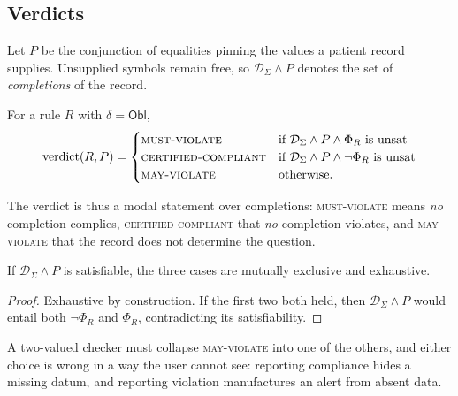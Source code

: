 \subsection{Verdicts}
\label{sec:verdict}

Let $P$ be the conjunction of equalities pinning the values a patient record
supplies. Unsupplied symbols remain free, so $\mathcal{D}_\Sigma \wedge P$
denotes the set of \emph{completions} of the record.

\begin{definition}[Verdict]
For a rule $R$ with $\delta = \mathsf{Obl}$,
\[
\mathrm{verdict}(R,P) =
\begin{cases}
  \textsc{must-violate}
    & \text{if } \mathcal{D}_\Sigma \wedge P \wedge \Phi_R \text{ is unsat} \\
  \textsc{certified-compliant}
    & \text{if } \mathcal{D}_\Sigma \wedge P \wedge \neg\Phi_R \text{ is unsat} \\
  \textsc{may-violate} & \text{otherwise.}
\end{cases}
\]
\end{definition}

The verdict is thus a modal statement over completions: \textsc{must-violate}
means \emph{no} completion complies, \textsc{certified-compliant} that
\emph{no} completion violates, and \textsc{may-violate} that the record does
not determine the question.

\begin{proposition}
If $\mathcal{D}_\Sigma \wedge P$ is satisfiable, the three cases are mutually
exclusive and exhaustive.
\end{proposition}
\begin{proof}
Exhaustive by construction. If the first two both held, then
$\mathcal{D}_\Sigma \wedge P$ would entail both $\neg\Phi_R$ and $\Phi_R$,
contradicting its satisfiability.
\end{proof}

A two-valued checker must collapse \textsc{may-violate} into one of the others,
and either choice is wrong in a way the user cannot see: reporting compliance
hides a missing datum, and reporting violation manufactures an alert from
absent data.

